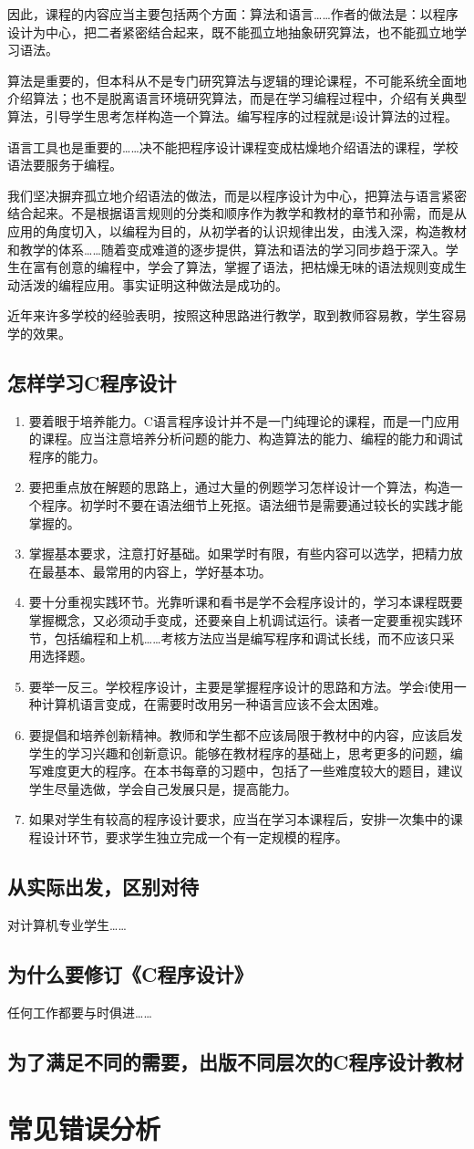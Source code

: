 因此，课程的内容应当主要包括两个方面：算法和语言……作者的做法是：以程序设计为中心，把二者紧密结合起来，既不能孤立地抽象研究算法，也不能孤立地学习语法。

算法是重要的，但本科从不是专门研究算法与逻辑的理论课程，不可能系统全面地介绍算法；也不是脱离语言环境研究算法，而是在学习编程过程中，介绍有关典型算法，引导学生思考怎样构造一个算法。编写程序的过程就是i设计算法的过程。

语言工具也是重要的……决不能把程序设计课程变成枯燥地介绍语法的课程，学校语法要服务于编程。

我们坚决摒弃孤立地介绍语法的做法，而是以程序设计为中心，把算法与语言紧密结合起来。不是根据语言规则的分类和顺序作为教学和教材的章节和孙需，而是从应用的角度切入，以编程为目的，从初学者的认识规律出发，由浅入深，构造教材和教学的体系……随着变成难道的逐步提供，算法和语法的学习同步趋于深入。学生在富有创意的编程中，学会了算法，掌握了语法，把枯燥无味的语法规则变成生动活泼的编程应用。事实证明这种做法是成功的。

近年来许多学校的经验表明，按照这种思路进行教学，取到教师容易教，学生容易学的效果。
\section{怎样学习C程序设计}
	\begin{enumerate}
		\item 要着眼于培养能力。C语言程序设计并不是一门纯理论的课程，而是一门应用的课程。应当注意培养分析问题的能力、构造算法的能力、编程的能力和调试程序的能力。
		\item 要把重点放在解题的思路上，通过大量的例题学习怎样设计一个算法，构造一个程序。初学时不要在语法细节上死抠。语法细节是需要通过较长的实践才能掌握的。
		\item 掌握基本要求，注意打好基础。如果学时有限，有些内容可以选学，把精力放在最基本、最常用的内容上，学好基本功。
		\item 要十分重视实践环节。光靠听课和看书是学不会程序设计的，学习本课程既要掌握概念，又必须动手变成，还要亲自上机调试运行。读者一定要重视实践环节，包括编程和上机……考核方法应当是编写程序和调试长线，而不应该只采用选择题。
		\item 要举一反三。学校程序设计，主要是掌握程序设计的思路和方法。学会i使用一种计算机语言变成，在需要时改用另一种语言应该不会太困难。
		\item 要提倡和培养创新精神。教师和学生都不应该局限于教材中的内容，应该启发学生的学习兴趣和创新意识。能够在教材程序的基础上，思考更多的问题，编写难度更大的程序。在本书每章的习题中，包括了一些难度较大的题目，建议学生尽量选做，学会自己发展只是，提高能力。
		\item 如果对学生有较高的程序设计要求，应当在学习本课程后，安排一次集中的课程设计环节，要求学生独立完成一个有一定规模的程序。
	\end{enumerate}
\section{从实际出发，区别对待}
对计算机专业学生……
\section{为什么要修订《C程序设计》}
任何工作都要与时俱进……
\section{为了满足不同的需要，出版不同层次的C程序设计教材}
\chapter{常见错误分析}

